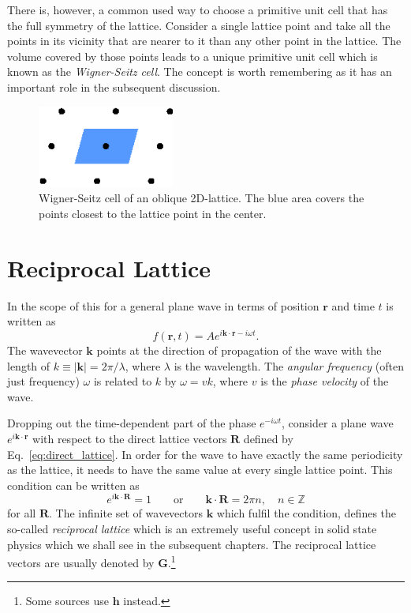 There is, however, a common used way to choose a primitive unit cell that has the full symmetry of the lattice. Consider a single lattice point and take all the points in its vicinity that are nearer to it than any other point in the lattice. The volume covered by those points leads to a unique primitive unit cell which is known as the \emph{Wigner-Seitz cell}. The concept is worth remembering as it has an important role in the subsequent discussion.

\vspace*{0.5cm}
\begin{figure}[h!]
\centering
\includegraphics[width=0.4\textwidth]{crystal_structure/figures/wigner-seitz.eps}
\caption{Wigner-Seitz cell of an oblique 2D-lattice. The blue area covers the points closest to the lattice point in the center.}
\end{figure}

\section{Reciprocal Lattice}
In the scope of this for a general plane wave in terms of position $\mathbf{r}$ and time $t$ is written as
\begin{equation}
f(\mathbf{r},t) = A e^{i\mathbf{k}\cdot\mathbf{r} - i\omega t}.
\end{equation}
The wavevector $\mathbf{k}$ points at the direction of propagation of the wave with the length of $k \equiv |\mathbf{k}| = 2\pi/\lambda$, where $\lambda$ is the wavelength. The \emph{angular frequency} (often just frequency) $\omega$ is related to $k$ by $\omega = v k$, where $v$ is the \emph{phase velocity} of the wave.

Dropping out the time-dependent part of the phase $e^{-i\omega t}$, consider a plane wave $e^{i\mathbf{k}\cdot\mathbf{r}}$ with respect to the direct lattice vectors $\mathbf{R}$ defined by Eq.~\eqref{eq:direct_lattice}. In order for the wave to have exactly the same periodicity as the lattice, it needs to have the same value at every single lattice point. This condition can be written as
\begin{equation}
e^{i\mathbf{k}\cdot\mathbf{R}} = 1 \qquad \mathrm{or} \qquad  \mathbf{k}\cdot\mathbf{R} = 2 \pi n, \quad n \in \mathbb{Z}
\end{equation}
for all $\mathbf{R}$. The infinite set of wavevectors $\mathbf{k}$ which fulfil the condition, defines the so-called \emph{reciprocal lattice} which is an extremely useful concept in solid state physics which we shall see in the subsequent chapters. The reciprocal lattice vectors are usually denoted by $\mathbf{G}$.\footnote{Some sources use $\mathbf{h}$ instead.}

